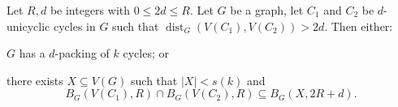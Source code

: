 \documentclass{patmorin}
\DeclareMathOperator{\dist}{dist}
\DeclarePairedDelimiter\set{\{}{\}}
\begin{document}
\begin{lem}\label{double_unicycle}
  Let $R,d$ be integers with $0\leq 2d\leq R$.
  Let $G$ be a graph,
  let $C_1$ and $C_2$ be $d$-unicyclic cycles in $G$ such that
  $\dist_G(V(C_1),V(C_2))>2d$.
  Then either:
  \begin{compactenum}[(a)]
    \item $G$ has a $d$-packing of $k$ cycles; or
    \item there exists $X\subseteq V(G)$ such that $|X|< s(k)$ and \[
    B_{G}(V(C_1),R)\cap B_{G}(V(C_2),R) \subseteq B_G(X,2R+d).%
    \]
  \end{compactenum}
\end{lem}


\begin{comment}
\begin{lem}\label{double_unicycle}
  Let $R,d$ be integers with $0\leq 2d\leq R$.
  Let $G$ be a graph,
  let $C_1$ and $C_2$ be $d$-unicyclic cycles in $G$ such that
  $\dist_G(V(C_1),V(C_2))>2d$.
  Let $Y_i\subseteq V(G)$ be such that $C_i-Y_i$ is an $R$-acyclic path in $G-Y_i$ and 
  $\set{B_{G-Y_i}(V(C_i)\setminus Y_i,R),Y_i}$ forms a partition of $B_G(V(C_i),R)$, for each in $i\in[2]$.
  Then either:
  \begin{compactenum}[(a)]
    \item $G$ has a $d$-packing of $k$ cycles; or
    \item there exists $X\subseteq V(G)$ such that $|X|< s(k)$ and \[
    B_{G-Y_1}(V(C_1)\setminus Y_1,R)\cap B_{G-Y_2}(V(C_2)\setminus Y_2,R) \subseteq B_G(X,2R+d) \cup B_G(Y_1\cup Y_2,R).
    \]
  \end{compactenum}
\end{lem}
\end{comment}
\end{document}
